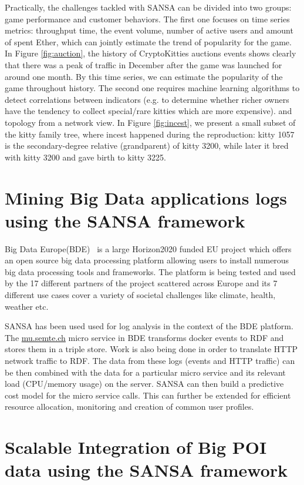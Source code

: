 Practically, the challenges tackled with SANSA can be divided into two groups: game performance and customer behaviors. The first one focuses on time series metrics: throughput time, the event volume, number of active users and amount of spent Ether, which can jointly estimate the trend of popularity for the game. In Figure \ref{fig:auction}, the history of CryptoKitties auctions events shows clearly that there was a peak of traffic in December after the game was launched for around one month. By this time series, we can estimate the popularity of the game throughout history.
The second one requires machine learning algorithms to detect correlations between indicators (e.g. to determine whether richer owners have the tendency to collect special/rare kitties which are more expensive). and topology from a network view. In Figure \ref{fig:incest}, we present a small subset of the kitty family tree, where incest happened during the reproduction: kitty 1057 is the secondary-degree relative (grandparent) of kitty 3200, while later it bred with kitty 3200 and gave birth to kitty 3225.


\section{Mining Big Data applications logs using the SANSA framework}
\label{sec:bde-use-case}
Big Data Europe(BDE)~\cite{Auer+ICWE-2017} is a large Horizon2020 funded EU project which offers an open source big data processing platform allowing users to install numerous big data processing tools and frameworks. 
The platform is being tested and used by the 17 different partners of the project scattered across Europe and its 7 different use cases cover a variety of societal challenges like climate, health, weather etc.

SANSA has been used used for log analysis in the context of the BDE platform.
The \url{mu.semte.ch} micro service in BDE transforms docker events to RDF and stores them in a triple store.
Work is also being done in order to translate HTTP network traffic to RDF. 
The data from these logs (events and HTTP traffic) can be then combined with the data for a particular micro service and its relevant load (CPU/memory usage) on the server. SANSA can then build a predictive cost model for the micro service calls. This can further be extended for efficient resource allocation, monitoring and creation of common user profiles.

\section{Scalable Integration of Big POI data using the SANSA framework}
\label{sec:slipo-use-case}

